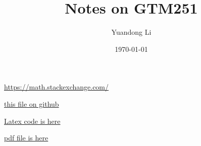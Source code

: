 \documentclass[a4paper,11pt]{article}
\title{Notes on GTM251}
\author{Yuandong Li}
\date{\today}
\begin{document}
\maketitle

\tableofcontents
\newpage

\url{https://math.stackexchange.com/}

\href{https://raw.githubusercontent.com/ocbaby/research_notes/fbfbf39a26362487ce0c1859e49a89646d013da1/Reading\%20Notes/Finite\%20Simple\%20Groups/wilson.pdf}{this file on github}

\href{./wilson.tex}{Latex code is here}

\href{./wilson.pdf}{pdf file is here}

\clearpage
 

\clearpage
 
\end{document}
